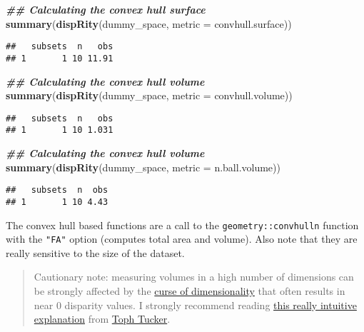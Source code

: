 \documentclass[
]{book}
\newenvironment{Shaded}{\begin{snugshade}}{\end{snugshade}}
\newcommand{\AttributeTok}[1]{\textcolor[rgb]{0.13,0.29,0.53}{#1}}
\newcommand{\DocumentationTok}[1]{\textcolor[rgb]{0.56,0.35,0.01}{\textbf{\textit{#1}}}}
\newcommand{\FunctionTok}[1]{\textcolor[rgb]{0.13,0.29,0.53}{\textbf{#1}}}
\newcommand{\NormalTok}[1]{#1}
\begin{document}
\begin{Shaded}
\begin{Highlighting}[]
\DocumentationTok{\#\# Calculating the convex hull surface}
\FunctionTok{summary}\NormalTok{(}\FunctionTok{dispRity}\NormalTok{(dummy\_space, }\AttributeTok{metric =}\NormalTok{ convhull.surface))}
\end{Highlighting}
\end{Shaded}

\begin{verbatim}
##   subsets  n   obs
## 1       1 10 11.91
\end{verbatim}

\begin{Shaded}
\begin{Highlighting}[]
\DocumentationTok{\#\# Calculating the convex hull volume}
\FunctionTok{summary}\NormalTok{(}\FunctionTok{dispRity}\NormalTok{(dummy\_space, }\AttributeTok{metric =}\NormalTok{ convhull.volume))}
\end{Highlighting}
\end{Shaded}

\begin{verbatim}
##   subsets  n   obs
## 1       1 10 1.031
\end{verbatim}

\begin{Shaded}
\begin{Highlighting}[]
\DocumentationTok{\#\# Calculating the convex hull volume}
\FunctionTok{summary}\NormalTok{(}\FunctionTok{dispRity}\NormalTok{(dummy\_space, }\AttributeTok{metric =}\NormalTok{ n.ball.volume))}
\end{Highlighting}
\end{Shaded}

\begin{verbatim}
##   subsets  n  obs
## 1       1 10 4.43
\end{verbatim}

The convex hull based functions are a call to the \texttt{geometry::convhulln} function with the \texttt{"FA"} option (computes total area and volume).
Also note that they are really sensitive to the size of the dataset.

\begin{quote}
Cautionary note: measuring volumes in a high number of dimensions can be strongly affected by the \href{https://en.wikipedia.org/wiki/Curse_of_dimensionality}{curse of dimensionality} that often results in near 0 disparity values. I strongly recommend reading \href{https://beta.observablehq.com/@tophtucker/theres-plenty-of-room-in-the-corners}{this really intuitive explanation} from \href{https://github.com/tophtucker}{Toph Tucker}.
\end{quote}
\end{document}
